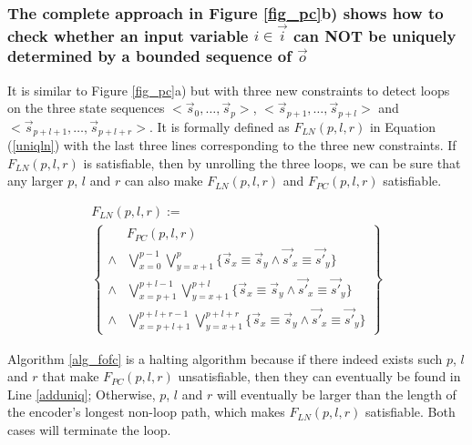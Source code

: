 \documentclass[conference]{IEEEtran}
\begin{document}
\subsubsection{The complete approach in Figure \ref{fig_pc}b) shows how to check whether
an input variable $i\in\vec{i}$ can NOT be uniquely determined by a bounded sequence of $\vec{o}$}\label{subsub_complete}

It is similar to Figure \ref{fig_pc}a) but with three new constraints to detect loops 
on the three state sequences $<\vec{s}_{0},\dots,\vec{s}_{p}>$, $<\vec{s}_{p+1},\dots,\vec{s}_{p+l}>$ and 
$<\vec{s}_{p+l+1},\dots,\vec{s}_{p+l+r}>$.
It is formally defined as $F_{LN}(p,l,r)$ in Equation (\ref{uniqln}) 
with the last three lines corresponding to the three new constraints.
If $F_{LN}(p,l,r)$ is satisfiable,
then by unrolling the three loops,
we can be sure that any larger  $p$, $l$ and $r$ can also make $F_{LN}(p,l,r)$ and $F_{PC}(p,l,r)$ satisfiable.

\begin{multline}\label{uniqln}
F_{LN}(p,l,r):=\\
\left\{
\begin{array}{cc}
&F_{PC}(p,l,r)\\
\wedge&\bigvee_{x=0}^{p-1}\bigvee_{y=x+1}^{p} \{\vec{s}_x\equiv \vec{s}_y\wedge \vec{s'}_x\equiv \vec{s'}_y\} \\
\wedge&\bigvee_{x=p+1}^{p+l-1}\bigvee_{y=x+1}^{p+l} \{\vec{s}_x\equiv \vec{s}_y\wedge \vec{s'}_x\equiv \vec{s'}_y\} \\
\wedge&\bigvee_{x=p+l+1}^{p+l+r-1}\bigvee_{y=x+1}^{p+l+r} \{\vec{s}_x\equiv \vec{s}_y\wedge \vec{s'}_x\equiv \vec{s'}_y\}
\end{array}
\right\}
\end{multline}

Algorithm \ref{alg_fofc} is a halting algorithm because 
if there indeed exists such $p$, $l$ and $r$ that make $F_{PC}(p,l,r)$ unsatisfiable,
then they can eventually be found in Line \ref{adduniq};
Otherwise,
$p$, $l$ and $r$ will eventually be larger than the length of the encoder's longest non-loop path,
which makes $F_{LN}(p,l,r)$ satisfiable.
Both cases will terminate the loop.
\end{document}
